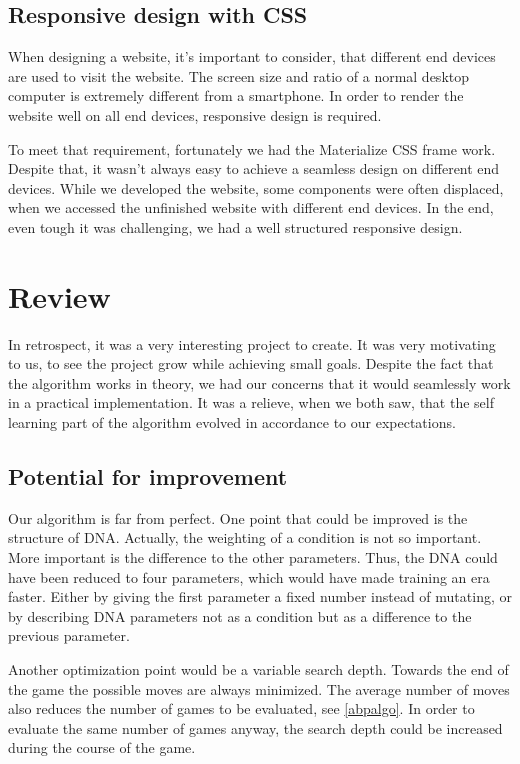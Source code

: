 \subsection{Responsive design with CSS}
When designing a website, it's important to consider, that different end devices are used to visit the website. The screen size and ratio of a normal desktop computer is extremely different from a smartphone. In order to render the website well on all end devices, \ac{responsive} design is required. 

To meet that requirement, fortunately we had the Materialize CSS frame work. Despite that, it wasn't always easy to achieve a seamless design on different end devices. While we developed the website, some components were often displaced, when we accessed the unfinished website with different end devices. 
In the end, even tough it was challenging, we had a well structured responsive design.

\section{Review}
In retrospect, it was a very interesting project to create. It was very motivating to us, to see the project grow while achieving small goals. Despite the fact that the algorithm works in theory, we had our concerns that it would seamlessly work in a practical implementation. It was a relieve, when we both saw, that the self learning part of the algorithm evolved in accordance to our expectations.

\subsection{Potential for improvement}
Our algorithm is far from perfect. One point that could be improved is the structure of DNA. Actually, the weighting of a condition is not so important. More important is the difference to the other parameters. Thus, the DNA could have been reduced to four parameters, which would have made training an era faster. Either by giving the first parameter a fixed number instead of mutating, or by describing DNA parameters not as a condition but as a difference to the previous parameter.

Another optimization point would be a variable search depth. Towards the end of the game the possible moves are always minimized. The average number of moves also reduces the number of games to be evaluated, see \autoref{abpalgo}. In order to evaluate the same number of games anyway, the search depth could be increased during the course of the game.
